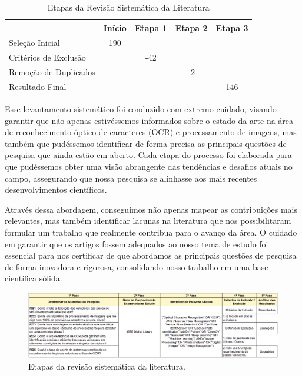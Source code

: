 \documentclass[conference]{IEEEtran}
\begin{document}
\begin{table}[H]
    \caption{Etapas da Revisão Sistemática da Literatura}
    \begin{center}
        \begin{tabular}{l|c|c|c|c|}
            \cline{2-5}
            & Início & Etapa 1 & Etapa 2 & Etapa 3 \\ \hline
            \multicolumn{1}{|l|}{Seleção Inicial}       & 190    &         &         &         \\ \hline
            \multicolumn{1}{|l|}{Critérios de Exclusão} &        & -42     &         &         \\ \hline
            \multicolumn{1}{|l|}{Remoção de Duplicados} &        &         & -2      &         \\ \hline
            \multicolumn{1}{|l|}{Resultado Final}       &        &         &         & 146     \\ \hline
        \end{tabular}
        \label{tab1}
    \end{center}
\end{table}

Esse levantamento sistemático foi conduzido com extremo cuidado, visando garantir que não apenas estivéssemos informados sobre o estado da arte na área de reconhecimento óptico de caracteres (OCR) e processamento de imagens, mas também que pudéssemos identificar de forma precisa as principais questões de pesquisa que ainda estão em aberto. Cada etapa do processo foi elaborada para que pudéssemos obter uma visão abrangente das tendências e desafios atuais no campo, assegurando que nossa pesquisa se alinhasse aos mais recentes desenvolvimentos científicos.

Através dessa abordagem, conseguimos não apenas mapear as contribuições mais relevantes, mas também identificar lacunas na literatura que nos possibilitaram formular um trabalho que realmente contribua para o avanço da área. O cuidado em garantir que os artigos fossem adequados ao nosso tema de estudo foi essencial para nos certificar de que abordamos as principais questões de pesquisa de forma inovadora e rigorosa, consolidando nosso trabalho em uma base científica sólida.

\begin{figure}[htbp]
	\centerline{\includegraphics[width=\textwidth]{img1.png}}
	\caption{Etapas da revisão sistemática da literatura.}
	\label{img1}
\end{figure}
\end{document}

